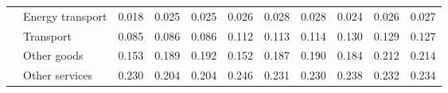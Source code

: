 \begin{tabular}{c|l|lll|lll|lll}
                                                                                   & Energy transport            & 0.018  & 0.025 & 0.025 & 0.026  & 0.028 & 0.028 & 0.024 & 0.026 & 0.027 \\
                                                                                   & Transport                   & 0.085  & 0.086 & 0.086 & 0.112  & 0.113 & 0.114 & 0.130 & 0.129 & 0.127 \\
                                                                                   & Other goods                 & 0.153  & 0.189 & 0.192 & 0.152  & 0.187 & 0.190 & 0.184 & 0.212 & 0.214 \\
                                                                                   & Other services              & 0.230  & 0.204 & 0.204 & 0.246  & 0.231 & 0.230 & 0.238 & 0.232 & 0.234 \\ \hline \bottomrule
\end{tabular}